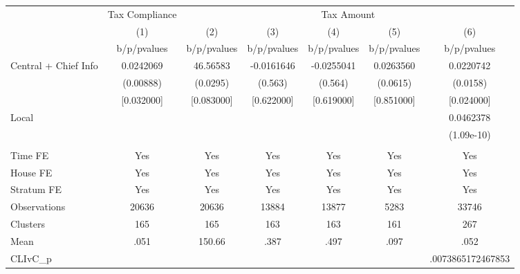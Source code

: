 {
\def\sym#1{\ifmmode^{#1}\else\(^{#1}\)\fi}
\begin{tabular}{l*{6}{c}}
\toprule
                &\multicolumn{1}{c}{Tax Compliance}&\multicolumn{5}{c}{Tax Amount}                   \\
                &\multicolumn{1}{c}{(1)}&\multicolumn{1}{c}{(2)}&\multicolumn{1}{c}{(3)}&\multicolumn{1}{c}{(4)}&\multicolumn{1}{c}{(5)}&\multicolumn{1}{c}{(6)}\\
                &b/p/pvalues&b/p/pvalues&b/p/pvalues&b/p/pvalues&b/p/pvalues&b/p/pvalues\\
\midrule
Central + Chief Info&0.0242069& 46.56583&-0.0161646&-0.0255041&0.0263560&0.0220742\\
                &(0.00888)& (0.0295)&  (0.563)&  (0.564)& (0.0615)& (0.0158)\\
                &[0.032000]&[0.083000]&[0.622000]&[0.619000]&[0.851000]&[0.024000]\\
Local           &         &         &         &         &         &0.0462378\\
                &         &         &         &         &         &(1.09e-10)\\
                &         &         &         &         &         &         \\
Time FE         &      Yes&      Yes&      Yes&      Yes&      Yes&      Yes\\
House FE        &      Yes&      Yes&      Yes&      Yes&      Yes&      Yes\\
Stratum FE      &      Yes&      Yes&      Yes&      Yes&      Yes&      Yes\\
\midrule
Observations    &    20636&    20636&    13884&    13877&     5283&    33746\\
Clusters        &      165&      165&      163&      163&      161&      267\\
Mean            &     .051&   150.66&     .387&     .497&     .097&     .052\\
CLIvC\_p         &         &         &         &         &         &.0073865172467853\\
\bottomrule
\end{tabular}
}
